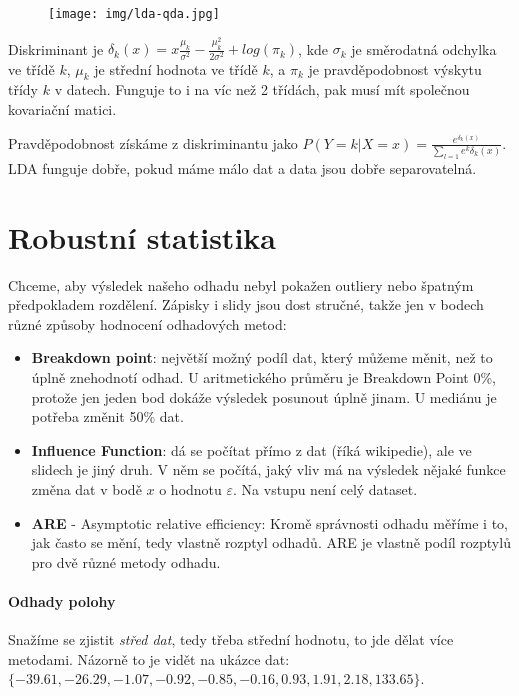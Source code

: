 \documentclass[10pt,a4paper]{article}
\begin{document}
\begin{figure}[ht!]
\centering
\texttt{[image: img/lda-qda.jpg]}
\end{figure}

Diskriminant je $\delta_k(x) = x\frac{\mu_k}{\sigma^2} - \frac{\mu_k^2}{2\sigma^2} + log(\pi_k)$, kde $\sigma_k$ je směrodatná odchylka ve třídě $k$, $\mu_k$ je střední hodnota ve třídě $k$, a $\pi_k$ je pravděpodobnost výskytu třídy $k$ v datech. Funguje to i na víc než 2 třídách, pak musí mít společnou kovariační matici.

Pravděpodobnost získáme z diskriminantu jako $P(Y=k|X=x) = \frac{e^{\delta_k(x)}}{\sum_{l=1}e^k{\delta_k(x)}}$. LDA funguje dobře, pokud máme málo dat a data jsou dobře separovatelná.




\section{Robustní statistika}

Chceme, aby výsledek našeho odhadu nebyl pokažen outliery nebo špatným předpokladem rozdělení. Zápisky i slidy jsou dost stručné, takže jen v bodech různé způsoby hodnocení odhadových metod:

\begin{itemize}
\item \textbf{Breakdown point}: největší možný podíl dat, který můžeme měnit, než to úplně znehodnotí odhad. U aritmetického průměru je Breakdown Point 0\%, protože jen jeden bod dokáže výsledek posunout úplně jinam. U mediánu je potřeba změnit 50\% dat.
\item \textbf{Influence Function}: dá se počítat přímo z dat (říká wikipedie), ale ve slidech je jiný druh. V něm se počítá, jaký vliv má na výsledek nějaké funkce změna dat v bodě $x$ o hodnotu $\varepsilon$. Na vstupu není celý dataset.
\item \textbf{ARE} - Asymptotic relative efficiency: Kromě správnosti odhadu měříme i to, jak často se mění, tedy vlastně rozptyl odhadů. ARE je vlastně podíl rozptylů pro dvě různé metody odhadu.
\end{itemize}

\paragraph{Odhady polohy} Snažíme se zjistit \textit{střed dat}, tedy třeba střední hodnotu, to jde dělat více metodami. Názorně to je vidět na ukázce dat: $\{-39.61, -26.29, -1.07, -0.92, -0.85, -0.16, 0.93, 1.91, 2.18, 133.65\}$.
\end{document}
